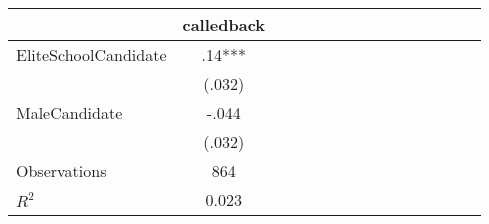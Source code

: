 \begin{tabular}{l*{14}{c}}
                    &\multicolumn{1}{c}{calledback}\\
\hline
EliteSchoolCandidate&         .14***\\
                    &      (.032)   \\
MaleCandidate       &       -.044   \\
                    &      (.032)   \\
\hline
Observations        &         864   \\
\(R^{2}\)           &       0.023   \\
\end{tabular}
